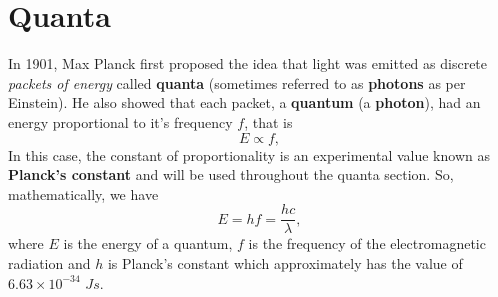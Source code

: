 \section{Quanta}

In 1901, Max Planck first proposed the idea that light was emitted as discrete \textit{packets of energy} called \textbf{quanta} (sometimes referred to as \textbf{photons} as per Einstein). He also showed that each packet, a \textbf{quantum} (a \textbf{photon}), had an energy proportional to it's frequency $f$, that is
\begin{equation*}
    E \propto f,
\end{equation*}
In this case, the constant of proportionality is an experimental value known as \textbf{Planck's constant} and will be used throughout the quanta section. So, mathematically, we have
\begin{equation}
    E = h f = \frac{h c}{\lambda},
\end{equation}
where $E$ is the energy of a quantum, $f$ is the frequency of the electromagnetic radiation and $h$ is Planck's constant which approximately has the value of $6.63 \times 10^{-34}$ $Js$.

